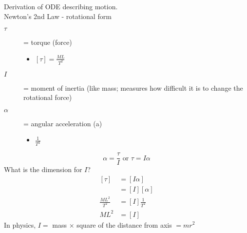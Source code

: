 \documentclass[
	date={August 26{,} 2024}
]{math486notes}
\begin{document}
\begin{example}
	Derivation of ODE describing motion.\\

	Newton's 2nd Law - rotational form
	\begin{description}
		\item[$\tau$] = torque (force)
		\begin{itemize}
			\item $[\tau] = \frac{ML}{T^{2}}$
		\end{itemize}
		\item[$I$] = moment of inertia (like mass; measures how difficult it is to change the rotational force)
		\item[$\alpha$] = angular acceleration (a)
		\begin{itemize}
			\item $\frac{1}{T^{2}}$
		\end{itemize}
	\end{description}
	\[ \alpha = \frac{\tau}{I} \mbox{  or  } \tau = I\alpha \]
	What is the dimension for $I$?
	\begin{equation*}
	\begin{aligned}
		[\tau] &= [I\alpha]\\
			   &= [I][\alpha]\\
		\frac{ML^{2}}{T^{2}} &= [I]\frac{1}{T^{2}}\\
		ML^{2} &= [I]
	\end{aligned}
	\end{equation*}
	In physics, $I=$ mass $\times$ square of the distance from axis $=mr^{2}$


\end{example}
\end{document}
